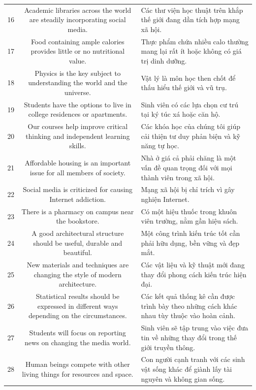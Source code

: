 \documentclass[11pt,a4paper]{article}
\begin{document}
\begin{longtable}{N S M}
16 & Academic libraries across the world are steadily incorporating social media. & Các thư viện học thuật trên khắp thế giới đang dần tích hợp mạng xã hội. \\
17 & Food containing ample calories provides little or no nutritional value. & Thực phẩm chứa nhiều calo thường mang lại rất ít hoặc không có giá trị dinh dưỡng. \\
18 & Physics is the key subject to understanding the world and the universe. & Vật lý là môn học then chốt để thấu hiểu thế giới và vũ trụ. \\
19 & Students have the options to live in college residences or apartments. & Sinh viên có các lựa chọn cư trú tại ký túc xá hoặc căn hộ. \\
20 & Our courses help improve critical thinking and independent learning skills. & Các khóa học của chúng tôi giúp cải thiện tư duy phản biện và kỹ năng tự học. \\
21 & Affordable housing is an important issue for all members of society. & Nhà ở giá cả phải chăng là một vấn đề quan trọng đối với mọi thành viên trong xã hội. \\
22 & Social media is criticized for causing Internet addiction. & Mạng xã hội bị chỉ trích vì gây nghiện Internet. \\
23 & There is a pharmacy on campus near the bookstore. & Có một hiệu thuốc trong khuôn viên trường, nằm gần hiệu sách. \\
24 & A good architectural structure should be useful, durable and beautiful. & Một công trình kiến ​​trúc tốt cần phải hữu dụng, bền vững và đẹp mắt. \\
25 & New materials and techniques are changing the style of modern architecture. & Các vật liệu và kỹ thuật mới đang thay đổi phong cách kiến ​​trúc hiện đại. \\
26 & Statistical results should be expressed in different ways depending on the circumstances. & Các kết quả thống kê cần được trình bày theo những cách khác nhau tùy thuộc vào hoàn cảnh. \\
27 & Students will focus on reporting news on changing the media world. & Sinh viên sẽ tập trung vào việc đưa tin về những thay đổi trong thế giới truyền thông. \\
28 & Human beings compete with other living things for resources and space. & Con người cạnh tranh với các sinh vật sống khác để giành lấy tài nguyên và không gian sống. \\

\end{longtable}
\end{document}
